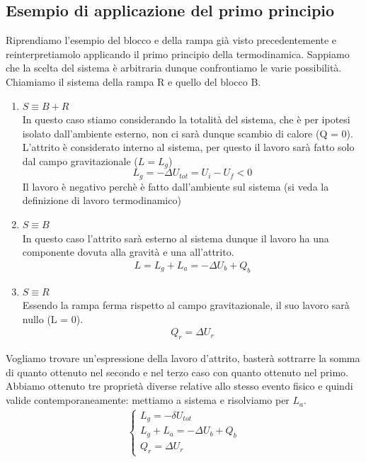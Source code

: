 \documentclass[
10pt, %
a4paper, %
oneside, %
headinclude,footinclude, %
BCOR5mm, %
]{scrartcl}
\begin{document}
\subsection{Esempio di applicazione del primo principio}
Riprendiamo l'esempio del blocco e della rampa già visto precedentemente e reinterpretiamolo applicando il primo principio della termodinamica. Sappiamo che la scelta del sistema è arbitraria dunque confrontiamo le varie possibilità. Chiamiamo il sistema della rampa R e quello del blocco B.
\begin{enumerate}
	\item $S \equiv B + R$\\
	In questo caso stiamo considerando la totalità del sistema, che è per ipotesi isolato dall'ambiente esterno, non ci sarà dunque scambio di calore (Q = 0). L'attrito è considerato interno al sistema, per questo il lavoro sarà fatto solo dal campo gravitazionale ($L = L_g$)
	\begin{equation}
		L_g = -\Delta U_{tot} = U_i-U_f < 0
	\end{equation} 
	Il lavoro è negativo perchè è fatto dall'ambiente sul sistema (si veda la definizione di lavoro termodinamico)
	\item $S\equiv B$\\
	In questo caso l'attrito sarà esterno al sistema dunque il lavoro ha una componente dovuta alla gravità e una all'attrito. 
	\begin{align*} 
		L = L_g + L_a = - \Delta U_b + Q_b
	\end{align*} 
	\item $S\equiv R$\\
	Essendo la rampa ferma rispetto al campo gravitazionale, il suo lavoro sarà nullo (L = 0).
	\begin{align*} 
		Q_r = \Delta U_r
	\end{align*}  
\end{enumerate}
Vogliamo trovare un'espressione della lavoro d'attrito, basterà sottrarre la somma di quanto ottenuto nel secondo e nel terzo caso con quanto ottenuto nel primo. Abbiamo ottenuto tre proprietà diverse relative allo stesso evento fisico e quindi valide contemporaneamente: mettiamo a sistema e risolviamo per $L_a$.
\begin{align*} 
	\begin{cases}
		L_g =  -\delta U_{tot} \\
		L_g + L_a = - \Delta U_b + Q_b\\
		Q_r = \Delta U_r
	\end{cases}
\end{align*} 
\end{document}
